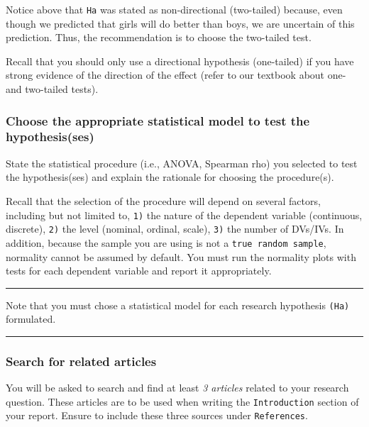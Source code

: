 \documentclass[
]{article}
\begin{document}
Notice above that \texttt{Ha} was stated as non-directional (two-tailed) because, even though we predicted that girls will do better than boys, we are uncertain of this prediction. Thus, the recommendation is to choose the two-tailed test.

Recall that you should only use a directional hypothesis (one-tailed) if you have strong evidence of the direction of the effect (refer to our textbook about one- and two-tailed tests).

\hypertarget{choose-the-appropriate-statistical-model-to-test-the-hypothesisses}{%
\subsubsection{Choose the appropriate statistical model to test the hypothesis(ses)}\label{choose-the-appropriate-statistical-model-to-test-the-hypothesisses}}

State the statistical procedure (i.e., ANOVA, Spearman rho) you selected to test the hypothesis(ses) and explain the rationale for choosing the procedure(s).

Recall that the selection of the procedure will depend on several factors, including but not limited to, \texttt{1)} the nature of the dependent variable (continuous, discrete), \texttt{2)} the level (nominal, ordinal, scale), \texttt{3)} the number of DVs/IVs. In addition, because the sample you are using is not a \texttt{true\ random\ sample}, normality cannot be assumed by default. You must run the normality plots with tests for each dependent variable and report it appropriately.

\begin{center}\rule{0.5\linewidth}{0.5pt}\end{center}

Note that you must chose a statistical model for each research hypothesis \texttt{(Ha)} formulated.

\begin{center}\rule{0.5\linewidth}{0.5pt}\end{center}

\hypertarget{articles}{%
\subsubsection{Search for related articles}\label{articles}}

You will be asked to search and find at least \emph{3 articles} related to your research question. These articles are to be used when writing the \texttt{Introduction} section of your report. Ensure to include these three sources under \texttt{References}.
\end{document}
